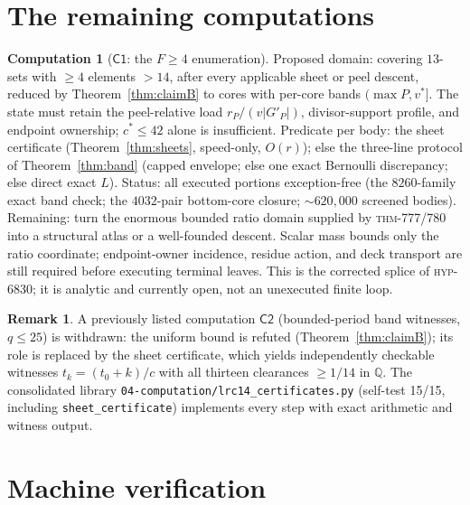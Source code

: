 \documentclass[11pt]{article}
\theoremstyle{definition}
\newtheorem{computation}[theorem]{Computation}
\newtheorem{remark}[theorem]{Remark}
\newcommand{\Qb}{\mathbb{Q}}
\newcommand{\repo}[1]{\texttt{#1}}
\begin{document}
\section{The remaining computations}\label{sec:computations}

\begin{computation}[$\mathsf{C1}$: the $F\ge4$ enumeration]\label{comp:c1}
Proposed domain: covering $13$-sets with $\ge4$ elements $>14$, after every applicable
sheet or peel descent, reduced by Theorem~\ref{thm:claimB} to cores with per-core bands
$(\max P, v^\ast]$. The state must retain the peel-relative load
$r_P/(v|G'_P|)$, divisor-support profile, and endpoint ownership; $c^\ast\le42$ alone is
insufficient. Predicate per body: the
sheet certificate (Theorem~\ref{thm:sheets}, speed-only, $O(r)$); else the three-line
protocol of Theorem~\ref{thm:band} (capped envelope; else one exact Bernoulli discrepancy;
else direct exact $L$). Status: all executed portions exception-free (the $8260$-family
exact band check; the $4032$-pair bottom-core closure; $\sim\!620{,}000$ screened bodies).
Remaining: turn the enormous bounded ratio domain supplied by
\textsc{thm}-777/780 into a structural atlas or a well-founded descent. Scalar
mass bounds only the ratio coordinate; endpoint-owner incidence, residue action,
and deck transport are still required before executing terminal leaves. This is the corrected splice of
\textsc{hyp}-6830; it is analytic and currently open, not an unexecuted finite loop.
\end{computation}

\begin{remark}
A previously listed computation $\mathsf{C2}$ (bounded-period band witnesses, $q\le25$) is
withdrawn: the uniform bound is refuted (Theorem~\ref{thm:claimB}); its role is replaced by
the sheet certificate, which yields independently checkable witnesses $t_k=(t_0+k)/c$ with
all thirteen clearances $\ge1/14$ in $\Qb$. The consolidated library
\repo{04-computation/lrc14\_certificates.py} (self-test 15/15, including
\texttt{sheet\_certificate}) implements every step with exact arithmetic and witness
output.
\end{remark}

\section{Machine verification}\label{sec:lean}
\end{document}
